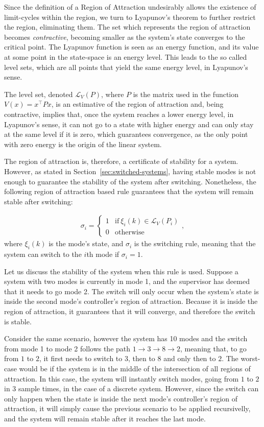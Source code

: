 Since the definition of a Region of Attraction undesirably allows the existence
of limit-cycles within the region, we turn to Lyapunov's theorem to further
restrict the region, eliminating them. The set which represents the region of
attraction becomes \textit{contractive}, becoming smaller as the system's state
converges to the critical point. The Lyapunov function is seen as an energy
function, and its value at some point in the state-space is an energy level.
This leads to the so called level sets, which are all points that yield the same
energy level, in Lyapunov's sense.

The level set, denoted \(\mathcal{L}_{V}(P)\), where \(P\) is the matrix used in
the function \(V(x)=x^{\top}Px\), is an estimative of the region of attraction and,
being contractive, implies that, once the system reaches a lower energy level,
in Lyapunov's sense, it can not go to a state with higher energy and can only
stay at the same level if it is zero, which guarantees convergence, as the only
point with zero energy is the origin of the linear system.

The region of attraction is, therefore, a certificate of stability for a system.
However, as stated in Section~\ref{sec:switched-systems}, having stable modes is
not enough to guarantee the stability of the system after switching.
Nonetheless, the following region of attraction based rule guarantees that the
system will remain stable after switching:

\begin{align}
  \sigma_{i} = \begin{cases}
    1 & \textrm{if}~\xi_{i}(k)\in\mathcal{L}_V(P_i) \\
    0 & \textrm{otherwise}
  \end{cases},
\end{align}
%
where \(\xi_{i}(k)\) is the mode's state, and \(\sigma_{i}\) is the switching rule,
meaning that the system can switch to the \(i\)th mode if \(\sigma_{i}=1\).

Let us discuss the stability of the system when this rule is used. Suppose a
system with two modes is currently in mode 1, and the supervisor has deemed that
it needs to go mode 2. The switch will only occur when the system's state is
inside the second mode's controller's region of attraction. Because it is inside
the region of attraction, it guarantees that it will converge, and therefore the
switch is stable.

Consider the same scenario, however the system has 10 modes and the switch from
mode 1 to mode 2 follows the path \(1 \rightarrow 3 \rightarrow 8 \rightarrow 2\), meaning that, to go from
\(1\) to \(2\), it first needs to switch to \(3\), then to \(8\) and only then
to \(2\). The worst-case would be if the system is in the middle of the
intersection of all regions of attraction. In this case, the system will
instantly switch modes, going from \(1\) to \(2\) in \(3\) sample times, in the
case of a discrete system. However, since the switch can only happen when the
state is inside the next mode's controller's region of attraction, it will
simply cause the previous scenario to be applied recursivelly, and the system
will remain stable after it reaches the last mode.

